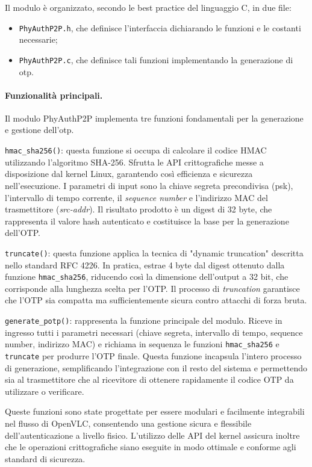 \noindent Il modulo è organizzato, secondo le best practice del linguaggio C, in due file:
\begin{itemize}
    \item \texttt{PhyAuthP2P.h}, che definisce l'interfaccia dichiarando le funzioni e le costanti necessarie;
    \item \texttt{PhyAuthP2P.c}, che definisce tali funzioni implementando la generazione di \gls{otp}.
\end{itemize}

\paragraph{Funzionalità principali.}
Il modulo PhyAuthP2P implementa tre funzioni fondamentali per la generazione e gestione dell'\gls{otp}.

\texttt{hmac\_sha256()}: questa funzione si occupa di calcolare il codice HMAC utilizzando l'algoritmo SHA-256. Sfrutta le API crittografiche messe a disposizione dal kernel Linux, garantendo così efficienza e sicurezza nell'esecuzione. I parametri di input sono la chiave segreta precondivisa (\gls{psk}), l'intervallo di tempo corrente, il \textit{sequence number} e l'indirizzo MAC del trasmettitore (\textit{src-addr}). Il risultato prodotto è un digest di 32 byte, che rappresenta il valore hash autenticato e costituisce la base per la generazione dell'OTP.

\texttt{truncate()}: questa funzione applica la tecnica di "dynamic truncation" descritta nello standard RFC 4226. In pratica, estrae 4 byte dal digest ottenuto dalla funzione \texttt{hmac\_sha256}, riducendo così la dimensione dell'output a 32 bit, che corrisponde alla lunghezza scelta per l'OTP. Il processo di \textit{truncation} garantisce che l'OTP sia compatta ma sufficientemente sicura contro attacchi di forza bruta.

\texttt{generate\_potp()}: rappresenta la funzione principale del modulo. Riceve in ingresso tutti i parametri necessari (chiave segreta, intervallo di tempo, sequence number, indirizzo MAC) e richiama in sequenza le funzioni \texttt{hmac\_sha256} e \texttt{truncate} per produrre l'OTP finale. Questa funzione incapsula l'intero processo di generazione, semplificando l'integrazione con il resto del sistema e permettendo sia al trasmettitore che al ricevitore di ottenere rapidamente il codice OTP da utilizzare o verificare.

Queste funzioni sono state progettate per essere modulari e facilmente integrabili nel flusso di OpenVLC, consentendo una gestione sicura e flessibile dell'autenticazione a livello fisico. L'utilizzo delle API del kernel assicura inoltre che le operazioni crittografiche siano eseguite in modo ottimale e conforme agli standard di sicurezza.

